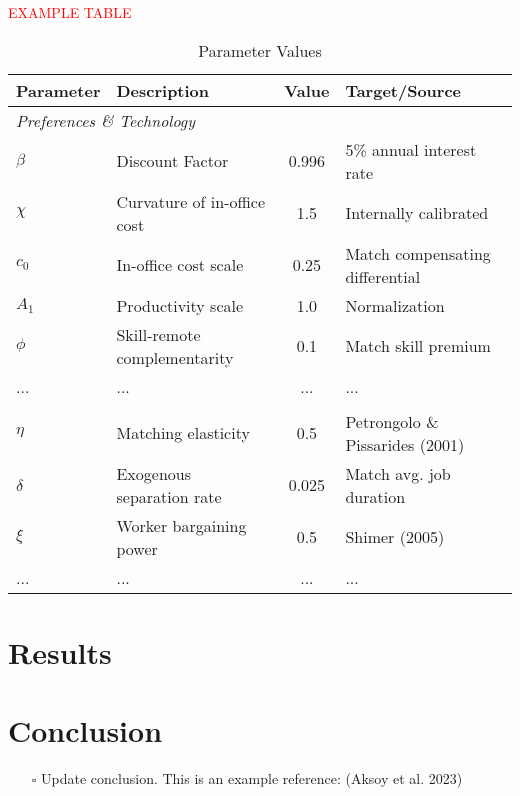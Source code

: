 \documentclass[
  11pt,
  letterpaper,
  DIV=11,
  numbers=noendperiod]{scrartcl}
\providecommand{\tightlist}{%
  \setlength{\itemsep}{0pt}\setlength{\parskip}{0pt}}\usepackage{longtable,booktabs,array}
\begin{document}
\textcolor{red}{EXAMPLE TABLE}

\begin{table}[h!]
\centering
\caption{Parameter Values}

\begin{tabular}{@{}llcl@{}}
\toprule
\textbf{Parameter} & \textbf{Description} & \textbf{Value} & \textbf{Target/Source} \\
\midrule
\multicolumn{4}{l}{\textit{Preferences \& Technology}} \\
$\beta$ & Discount Factor & 0.996 & 5\% annual interest rate \\
$\chi$ & Curvature of in-office cost & 1.5 & Internally calibrated \\
$c_0$ & In-office cost scale & 0.25 & Match compensating differential \\
$A_1$ & Productivity scale & 1.0 & Normalization \\
$\phi$ & Skill-remote complementarity & 0.1 & Match skill premium \\
... & ... & ... & ... \\
\addlinespace %
\multicolumn{4}{l}{\textit{Search \& Matching}} \\
$\eta$ & Matching elasticity & 0.5 & Petrongolo \& Pissarides (2001) \\
$\delta$ & Exogenous separation rate & 0.025 & Match avg. job duration \\
$\xi$ & Worker bargaining power & 0.5 & Shimer (2005) \\
... & ... & ... & ... \\
\bottomrule
\end{tabular}
\end{table}

\newpage

\section{Results}\label{results}

\section{Conclusion}\label{conclusion}

\begin{itemize}
\tightlist
\item[$\square$]
  Update conclusion. This is an example reference: (Aksoy et al. 2023)
\end{itemize}
\end{document}
